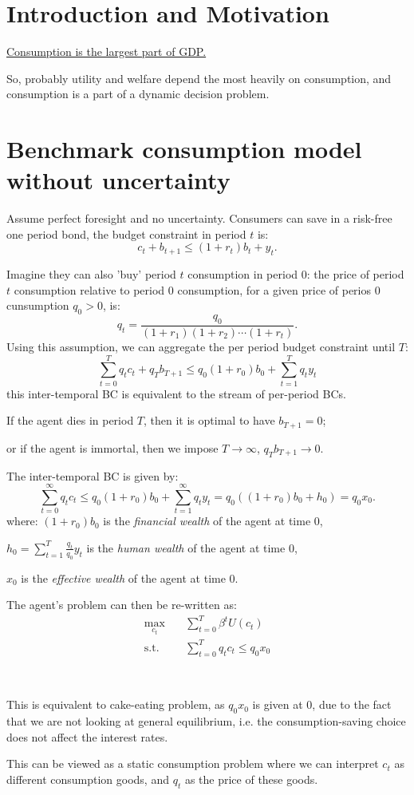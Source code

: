 \section{Introduction and Motivation}
\underline{Consumption is the largest part of GDP.}

So, probably utility and welfare depend the most heavily on
consumption, and consumption is a part of a dynamic decision problem.

\section{Benchmark consumption model without uncertainty}

Assume perfect foresight and no uncertainty. Consumers can save
in a risk-free one period bond, the budget constraint in period $t$ is:
\[c_t + b_{t+1} \leq (1+r_t)b_t + y_t. \]

Imagine they can also 'buy' period $t$ consumption in period 0:
the price of period $t$ consumption relative to period 0 consumption, for a given price of perios 0 cunsumption $q_0 > 0$, is:
\[q_t = \frac{q_0}{(1+r_1)(1+r_2)\cdots(1+r_t)}. \]
Using this assumption, we can aggregate the per period budget constraint until $T$:
\[\sum_{t=0}^{T} q_t c_t + q_T b_{T+1} \leq q_0(1+r_0)b_0 + \sum_{t=1}^{T} q_t y_t \]
this inter-temporal BC is equivalent to the stream of per-period BCs.

If the agent dies in period $T$, then it is optimal to have $b_{T+1} = 0$;

or if the agent is immortal, then we impose $T \to \infty$, $q_T b_{T+1} \to 0$.

The inter-temporal BC is given by:
\[\sum_{t=0}^{\infty} q_t c_t \leq q_0 (1+r_0) b_0 + \sum_{t=1}^{\infty} q_t y_t = q_0 ((1+r_0)b_0 + h_0) = q_0 x_0. \]
where:
$(1+r_0)b_0$ is the \textit{financial wealth} of the agent at time 0,

$h_0 = \sum_{t=1}^{T}\frac{q_t}{q_0}y_t$ is the \textit{human wealth} of the agent at time 0,

$x_0$ is the \textit{effective wealth} of the agent at time 0.

The agent’s problem can then be re-written as:
\begin{align*}
    \max_{c_t} &\quad \sum_{t=0}^{T} \beta^t U(c_t) \\
    \text{s.t.} &\quad \sum_{t=0}^{T} q_t c_t \leq q_0 x_0
\end{align*}

\begin{note}
    \

    This is equivalent to cake-eating problem, as $q_0 x_0$ is given at 0,
    due to the fact that we are not looking at general equilibrium, i.e. the consumption-saving choice 
    does not affect the interest rates.

    This can be viewed as a static consumption problem where
    we can interpret $c_t$ as different consumption goods, and $q_t$ as the price of these goods.
\end{note}


